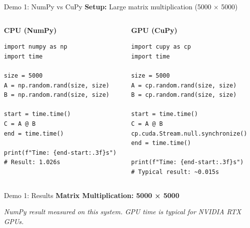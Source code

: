 \documentclass[10pt]{beamer}
\begin{document}
\begin{frame}[fragile]{Demo 1: NumPy vs CuPy}
  \textbf{Setup:} Large matrix multiplication (5000 × 5000)
  
  \vspace{0.5em}
  \begin{columns}[T]
    \begin{column}{0.48\textwidth}
      \textbf{CPU (NumPy)}
      \tiny
\begin{verbatim}
import numpy as np
import time

size = 5000
A = np.random.rand(size, size)
B = np.random.rand(size, size)

start = time.time()
C = A @ B
end = time.time()

print(f"Time: {end-start:.3f}s")
# Result: 1.026s
\end{verbatim}
    \end{column}
    \begin{column}{0.48\textwidth}
      \textbf{GPU (CuPy)}
      \tiny
\begin{verbatim}
import cupy as cp
import time

size = 5000
A = cp.random.rand(size, size)
B = cp.random.rand(size, size)

start = time.time()
C = A @ B
cp.cuda.Stream.null.synchronize()
end = time.time()

print(f"Time: {end-start:.3f}s")
# Typical result: ~0.015s
\end{verbatim}
    \end{column}
  \end{columns}
\end{frame}

\begin{frame}{Demo 1: Results}
  \textbf{Matrix Multiplication: 5000 × 5000}
  
  \vspace{1em}
  \begin{center}
  \end{center}
  
  \vspace{1em}
  \small \textit{NumPy result measured on this system. GPU time is typical for NVIDIA RTX GPUs.}
\end{frame}
\end{document}
